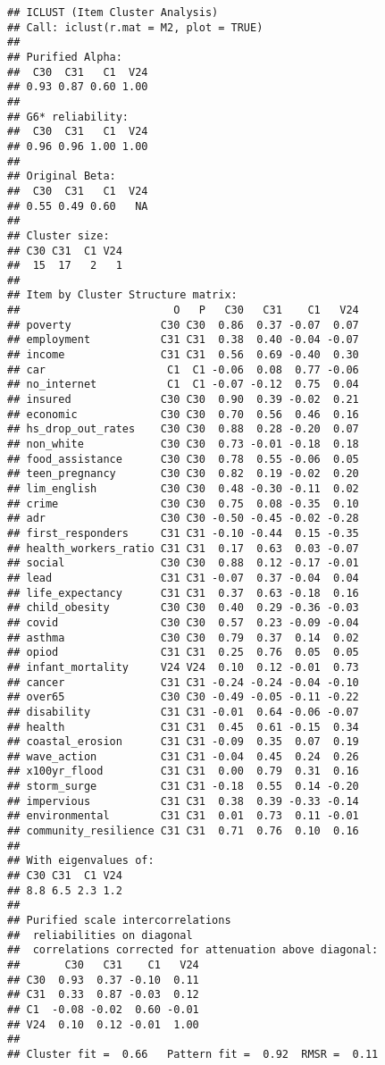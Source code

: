\documentclass[
]{article}
\begin{document}
\begin{verbatim}
## ICLUST (Item Cluster Analysis)
## Call: iclust(r.mat = M2, plot = TRUE)
## 
## Purified Alpha:
##  C30  C31   C1  V24 
## 0.93 0.87 0.60 1.00 
## 
## G6* reliability:
##  C30  C31   C1  V24 
## 0.96 0.96 1.00 1.00 
## 
## Original Beta:
##  C30  C31   C1  V24 
## 0.55 0.49 0.60   NA 
## 
## Cluster size:
## C30 C31  C1 V24 
##  15  17   2   1 
## 
## Item by Cluster Structure matrix:
##                        O   P   C30   C31    C1   V24
## poverty              C30 C30  0.86  0.37 -0.07  0.07
## employment           C31 C31  0.38  0.40 -0.04 -0.07
## income               C31 C31  0.56  0.69 -0.40  0.30
## car                   C1  C1 -0.06  0.08  0.77 -0.06
## no_internet           C1  C1 -0.07 -0.12  0.75  0.04
## insured              C30 C30  0.90  0.39 -0.02  0.21
## economic             C30 C30  0.70  0.56  0.46  0.16
## hs_drop_out_rates    C30 C30  0.88  0.28 -0.20  0.07
## non_white            C30 C30  0.73 -0.01 -0.18  0.18
## food_assistance      C30 C30  0.78  0.55 -0.06  0.05
## teen_pregnancy       C30 C30  0.82  0.19 -0.02  0.20
## lim_english          C30 C30  0.48 -0.30 -0.11  0.02
## crime                C30 C30  0.75  0.08 -0.35  0.10
## adr                  C30 C30 -0.50 -0.45 -0.02 -0.28
## first_responders     C31 C31 -0.10 -0.44  0.15 -0.35
## health_workers_ratio C31 C31  0.17  0.63  0.03 -0.07
## social               C30 C30  0.88  0.12 -0.17 -0.01
## lead                 C31 C31 -0.07  0.37 -0.04  0.04
## life_expectancy      C31 C31  0.37  0.63 -0.18  0.16
## child_obesity        C30 C30  0.40  0.29 -0.36 -0.03
## covid                C30 C30  0.57  0.23 -0.09 -0.04
## asthma               C30 C30  0.79  0.37  0.14  0.02
## opiod                C31 C31  0.25  0.76  0.05  0.05
## infant_mortality     V24 V24  0.10  0.12 -0.01  0.73
## cancer               C31 C31 -0.24 -0.24 -0.04 -0.10
## over65               C30 C30 -0.49 -0.05 -0.11 -0.22
## disability           C31 C31 -0.01  0.64 -0.06 -0.07
## health               C31 C31  0.45  0.61 -0.15  0.34
## coastal_erosion      C31 C31 -0.09  0.35  0.07  0.19
## wave_action          C31 C31 -0.04  0.45  0.24  0.26
## x100yr_flood         C31 C31  0.00  0.79  0.31  0.16
## storm_surge          C31 C31 -0.18  0.55  0.14 -0.20
## impervious           C31 C31  0.38  0.39 -0.33 -0.14
## environmental        C31 C31  0.01  0.73  0.11 -0.01
## community_resilience C31 C31  0.71  0.76  0.10  0.16
## 
## With eigenvalues of:
## C30 C31  C1 V24 
## 8.8 6.5 2.3 1.2 
## 
## Purified scale intercorrelations
##  reliabilities on diagonal
##  correlations corrected for attenuation above diagonal: 
##       C30   C31    C1   V24
## C30  0.93  0.37 -0.10  0.11
## C31  0.33  0.87 -0.03  0.12
## C1  -0.08 -0.02  0.60 -0.01
## V24  0.10  0.12 -0.01  1.00
## 
## Cluster fit =  0.66   Pattern fit =  0.92  RMSR =  0.11
\end{verbatim}
\end{document}
